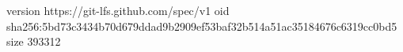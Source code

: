 version https://git-lfs.github.com/spec/v1
oid sha256:5bd73c3434b70d679ddad9b2909ef53baf32b514a51ac35184676c6319cc0bd5
size 393312
